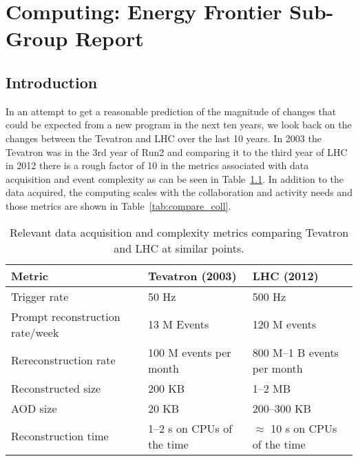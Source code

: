  
\chapter{Computing: Energy Frontier Sub-Group Report}
\label{chap:E2}


\begin{center}\begin{boldmath}



\end{boldmath}\end{center}


\section{Introduction}
\label{sec:comp-intro}

In an attempt to get a reasonable prediction of the magnitude of
changes that could be expected from a new program in the next ten
years, we look back on the changes between the Tevatron and LHC over
the last 10 years.  In 2003 the Tevatron was in the 3rd year of Run2
and comparing it to the third year of LHC in 2012 there is a rough
factor of 10 in the metrics associated with data acquisition and event
complexity as can be seen in Table~\ref{tab:compare_daq}. In addition
to the data acquired, the computing scales with the collaboration and
activity needs and those metrics are shown in
Table~\ref{tab:compare_coll}.

\begin{table}[t]
\begin{center}
\begin{tabular}{lll}
Metric & Tevatron (2003) & LHC (2012) \\ \hline
Trigger rate & 50 Hz & 500 Hz \\
Prompt reconstruction rate/week & 13 M Events & 120 M events \\
Rereconstruction rate & 100 M events per month & 800 M--1 B events per month \\
Reconstructed size & 200 KB & 1--2 MB \\
AOD size & 20 KB & 200--300 KB \\
Reconstruction time & 1--2 s on CPUs of the time & $\approx$ 10 s on CPUs of the time \\ \hline
\end{tabular}
\caption{Relevant data acquisition and complexity metrics comparing Tevatron and LHC at similar points.}
\label{tab:compare_daq}
\end{center}
\end{table}


